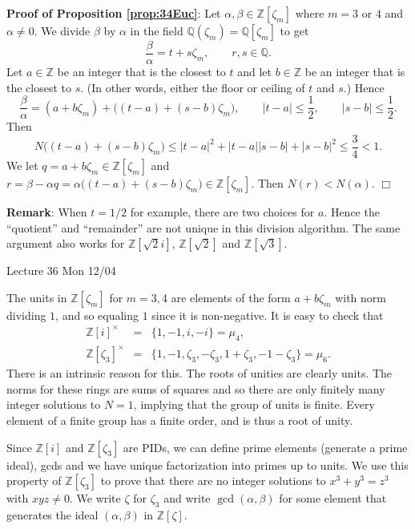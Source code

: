\documentclass{article}
\def\Z{{\mathbb Z}}
\def\Q{{\mathbb Q}}
\def\Z{{\mathbb Z}}
\def\Q{{\mathbb Q}}
\newcommand{\add}[1]{{\color{blue} #1}}
\begin{document}
\noindent\textbf{Proof of Proposition \ref{prop:34Euc}}:
    Let $\alpha,\beta\in \Z[\zeta_m]$ where $m = 3$ or $4$ and $\alpha\neq 0$. We divide $\beta$ by $\alpha$ in the field $\Q(\zeta_m) = \Q[\zeta_m]$ to get $$\frac{\beta}{\alpha} = t + s\zeta_m,\qquad r,s\in\Q.$$
    Let $a\in\Z$ be an integer that is the closest to $t$ and let $b\in\Z$ be an integer that is the closest to $s$. (In other words, either the floor or ceiling of $t$ and $s$.) Hence
    $$\frac{\beta}{\alpha} = (a + b\zeta_m) + \big((t - a) + (s - b)\zeta_m\big),\qquad |t-a| \leq \frac12,\qquad |s - b| \leq \frac12.$$
    Then
    $$N\big((t - a) + (s - b)\zeta_m\big) \leq |t-a|^2 + |t-a||s-b| + |s-b|^2 \leq \frac34 < 1.$$
    We let $q =  a+ b\zeta_m \in\Z[\zeta_m]$ and $r = \beta - \alpha q = \alpha\big((t - a) + (s - b)\zeta_m\big) \in\Z[\zeta_m].$ Then
    $N(r) < N(\alpha).$ $\Box$

\vspace{5pt}
\noindent\textbf{Remark}: When $t = 1/2$ for example, there are two choices for $a$. Hence the ``quotient'' and ``remainder'' are not unique in this division algorithm. The same argument also works for $\Z[\sqrt{2}i]$, $\Z[\sqrt{2}]$ and $\Z[\sqrt{3}].$



\begin{center}
    \add{Lecture 36 Mon 12/04}
\end{center}
The units in $\Z[\zeta_m]$ for $m=3,4$ are elements of the form $a+b\zeta_m$ with norm dividing $1$, and so equaling $1$ since it is non-negative. It is easy to check that
\begin{eqnarray*}
    \Z[i]^\times &=& \{1, -1, i, -i\} = \mu_4,\\
    \Z[\zeta_3]^\times &=& \{1, -1, \zeta_3, -\zeta_3, 1 + \zeta_3, -1 - \zeta_3\} = \mu_6.
\end{eqnarray*}
There is an intrinsic reason for this. The roots of unities are clearly units. The norms for these rings are sums of squares and so there are only finitely many integer solutions to $N = 1$, implying that the group of units is finite. Every element of a finite group has a finite order, and is thus a root of unity.

Since $\Z[i]$ and $\Z[\zeta_3]$ are PIDs, we can define prime elements (generate a prime ideal), gcds and we have unique factorization into primes up to units. We use this property of $\Z[\zeta_3]$ to prove that there are no integer solutions to $x^3 + y^3 = z^3$ with $xyz\neq 0$. We write $\zeta$ for $\zeta_3$ and write $\gcd(\alpha,\beta)$ for some element that generates the ideal $(\alpha,\beta)$ in $\Z[\zeta]$.
\end{document}
